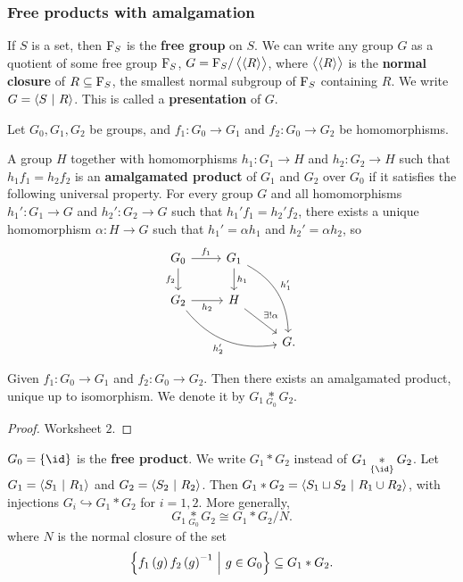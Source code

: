 \subsubsection{Free products with amalgamation}

\begin{definition*}
If $ S $ is a set, then $ \mathrm{F}_S $ is the \textbf{free group} on $ S $. We can write any group $ G $ as a quotient of some free group $ \mathrm{F}_S $, $ G = \mathrm{F}_S / \left\langle \left\langle R \right\rangle \right\rangle $, where $ \left\langle \left\langle R \right\rangle \right\rangle $ is the \textbf{normal closure} of $ R \subseteq \mathrm{F}_S $, the smallest normal subgroup of $ \mathrm{F}_S $ containing $ R $. We write $ G = \left\langle S \ \middle| \  R \right\rangle $. This is called a \textbf{presentation} of $ G $.
\end{definition*}

Let $ G_0, G_1, G_2 $ be groups, and $ f_1 : G_0 \to G_1 $ and $ f_2 : G_0 \to G_2 $ be homomorphisms.

\begin{definition*}
A group $ H $ together with homomorphisms $ h_1 : G_1 \to H $ and $ h_2 : G_2 \to H $ such that $ h_1f_1 = h_2f_2 $ is an \textbf{amalgamated product} of $ G_1 $ and $ G_2 $ over $ G_0 $ if it satisfies the following universal property. For every group $ G $ and all homomorphisms $ h_1' : G_1 \to G $ and $ h_2' : G_2 \to G $ such that $ h_1'f_1 = h_2'f_2 $, there exists a unique homomorphism $ \alpha : H \to G $ such that $ h_1' = \alpha h_1 $ and $ h_2' = \alpha h_2 $, so
$$
\begin{tikzcd}
G_0 \arrow{r}{f_1} \arrow[swap]{d}{f_2} & G_1 \arrow{d}{h_1} \arrow[bend left=30]{ddr}{h_1'} & \\
G_2 \arrow[swap]{r}{h_2} \arrow[bend right=30, swap]{drr}{h_2'} & H \arrow{dr}{\exists !\alpha} & \\
& & G.
\end{tikzcd}
$$
\end{definition*}

\begin{theorem}
Given $ f_1 : G_0 \to G_1 $ and $ f_2 : G_0 \to G_2 $. Then there exists an amalgamated product, unique up to isomorphism. We denote it by
$ G_1 \underset{G_0}{*} G_2 $.
\end{theorem}

\begin{proof}
Worksheet $ 2 $.
\end{proof}


$ G_0 = \cbr{\id} $ is the \textbf{free product}. We write $ G_1 * G_2 $ instead of $ G_1 \underset{\cbr{\id}}{*} G_2 $. Let $ G_1 = \left\langle S_1 \ \middle| \  R_1 \right\rangle $ and $ G_2 = \left\langle S_2 \ \middle| \  R_2 \right\rangle $. Then $ G_1 * G_2 = \left\langle S_1 \sqcup S_2 \ \middle| \  R_1 \cup R_2 \right\rangle $, with injections $ G_i \hookrightarrow G_1 * G_2 $ for $ i = 1, 2 $. More generally,
$$ G_1 \underset{G_0}{*} G_2 \cong G_1 * G_2 / N. $$
where $ N $ is the normal closure of the set
$$ \cbr{f_1\br{g}f_2\br{g}^{-1} \st g \in G_0} \subseteq G_1 * G_2. $$

